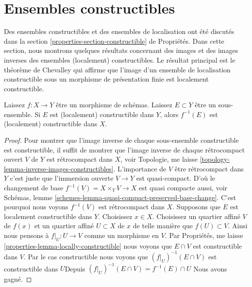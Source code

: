 \section{Ensembles constructibles}
\label{section-constructible}

\noindent
Des ensembles constructibles et des ensembles de localisation ont été discutés dans la section \ref{properties-section-constructible} de Propriétés. Dans cette section, nous montrons quelques résultats concernant des images et des images inverses des ensembles (localement) constructibles. Le résultat principal est le théorème de Chevalley qui affirme que l'image d'un ensemble de localisation constructible sous un morphisme de présentation finie est localement constructible.

\begin{lemma}

\label{lemma-inverse-image-constructible}
Laissez $f : X \to Y$ être un morphisme de schémas. Laissez $E \subset Y$ être un sous-ensemble. Si $E$ est (localement) constructible dans $Y$, alors $f^{-1}(E)$ est (localement) constructible dans $X$.
\end{lemma}

\begin{proof}

Pour montrer que l'image inverse de chaque sous-ensemble constructible est constructible, il suffit de montrer que l'image inverse de chaque rétrocompact ouvert $V$
de $Y$ est rétrocompact dans $X$, voir Topologie, me laisse \ref{topology-lemma-inverse-images-constructibles}. L'importance de $V$ être rétrocompact dans $Y$ c'est juste que l'immersion ouverte $V \to Y$ est quasi-compact. D'où le changement de base $f^{-1}(V) = X \times_Y V \to X$ est quasi compacte aussi, voir Schémas, lemme \ref{schemes-lemma-quasi-compact-preserved-base-change}. C'est pourquoi nous voyons $f^{-1}(V)$ est rétrocompact dans $X$. Supposons que $E$ est localement constructible dans $Y$. Choisissez $x \in X$. Choisissez un quartier affiné $V$ de $f(x)$ et un quartier affiné $U \subset X$ de $x$ de telle manière que $f(U) \subset V$. Ainsi nous pensons à $f|_U : U \to V$ comme un morphisme en $V$. Par Propriétés, me laisse \ref{properties-lemma-locally-constructible}
nous voyons que $E \cap V$ est constructible dans $V$. Par le cas constructible nous voyons que $(f|_U)^{-1}(E \cap V)$ est constructible dans $U$Depuis $(f|_U)^{-1}(E \cap V) = f^{-1}(E) \cap U$ Nous avons gagné.

\end{proof}

